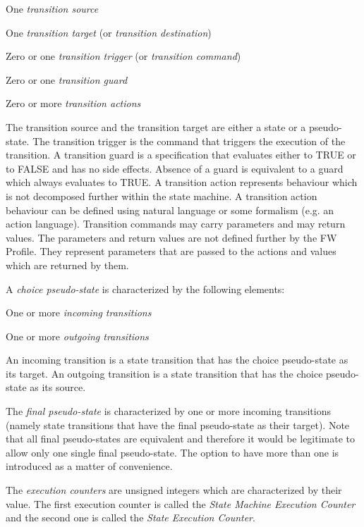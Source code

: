 \begin{fw_itemize}
\item One \emph{transition source}
\item One \emph{transition target} (or \emph{transition destination})
\item Zero or one \emph{transition trigger} (or \emph{transition command})
\item Zero or one \emph{transition guard}
\item Zero or more \emph{transition actions}
\end{fw_itemize}

The transition source and the transition target are either a state or a pseudo-state. The transition trigger is the command that triggers the execution 
of the transition. A transition guard is a specification that evaluates either to TRUE or to FALSE and has no side effects. Absence of a guard is equivalent to a guard which always evaluates to TRUE. A transition action represents 
behaviour which is not decomposed further within the state machine. A transition action behaviour can be defined using natural language or some formalism 
(e.g. an action language). Transition commands may carry parameters and may return values. The parameters and return values are not defined further by the 
FW Profile. They represent parameters that are passed to the actions and values which are returned by them. 

A \emph{choice pseudo-state} is characterized by the following elements:

\begin{fw_itemize}
\item One or more \emph{incoming transitions} 
\item One or more \emph{outgoing transitions}
\end{fw_itemize}

An incoming transition is a state transition that has the choice pseudo-state as its target. An outgoing transition is a state transition that has the 
choice pseudo-state as its source.

The \emph{final pseudo-state} is characterized by one or more incoming transitions (namely state transitions that have the final pseudo-state as their target). 
Note that all final pseudo-states are equivalent and therefore it would be legitimate to allow only one single final pseudo-state. The option to have more 
than one is introduced as a matter of convenience.

The \emph{execution counters} are unsigned integers which are characterized by their value.
The first execution counter is called the \emph{State Machine Execution Counter} and the second one
is called the \emph{State Execution Counter}.

